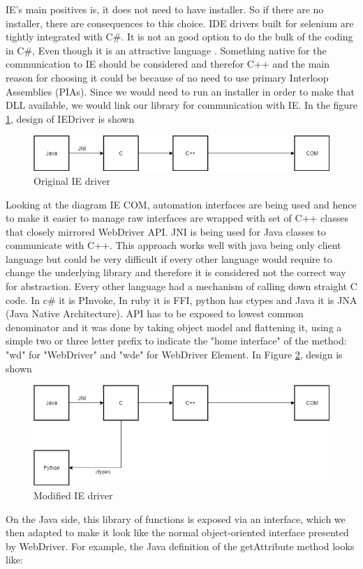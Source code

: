 \documentclass[article,type=msc,colorback,accentcolor=tud9c,twoside,11pt]{tudthesis}
\begin{document}
IE's main positives is, it does not need to have installer. So if there are no installer, there are consequences to this choice. IDE drivers built for selenium are tightly integrated with C\#. It is not an good option to do the bulk of the coding in C\#, Even though it is an attractive language . Something native for the communication to IE should be considered and therefor C++ and the main reason for choosing it could be because of no need to use primary Interloop Assemblies (PIAs). Since we would need to run an installer in order to make that DLL available, we would link our library for communication with IE. In the figure  \ref{fig:OriginalIEdriver}, design of IEDriver is shown 
\begin{figure}[h]
	\centering
	\includegraphics[scale=0.6]{OriginalIEdriver}
	\caption{Original IE driver}
	\label{fig:OriginalIEdriver}
\end{figure}
Looking at the diagram IE COM, automation interfaces are being used and hence to make it easier to manage raw interfaces are wrapped with set of C++ classes that closely mirrored WebDriver API. JNI is being used for Java classes to communicate with C++. This approach works well with java being only client language but could be very difficult if every other language would require to change the underlying library and therefore it is considered not the correct way for abstraction. Every other language had a mechanism of calling down straight C code. In c\# it is PInvoke, In ruby it is FFI, python has ctypes and Java it is JNA (Java Native Architecture). API has to be exposed to lowest common denominator and it was done by taking object model and flattening it, using a simple two or three letter prefix to indicate the "home interface" of the method: "wd" for "WebDriver" and "wde" for WebDriver Element. In Figure 
\ref{fig:ModifiedIEdriver}, design is shown 
\begin{figure}[h]
	\centering
	\includegraphics[scale=0.6]{ModifiedIEdriver.PNG}
	\caption{Modified IE driver}
	\label{fig:ModifiedIEdriver}
\end{figure}
On the Java side, this library of functions is exposed via an interface, which we then adapted to make it look like the normal object-oriented interface presented by WebDriver. For example, the Java definition of the getAttribute method looks like:
\end{document}
